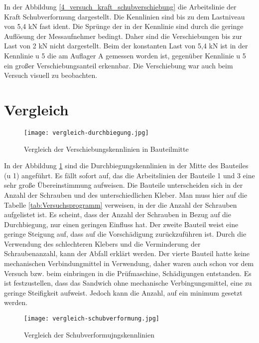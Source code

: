 \documentclass[12 pt,a4 paper ]{scrreprt}
\begin{document}
In der Abbildung \ref{4_versuch_kraft_schubverschiebung} die Arbeitslinie der Kraft Schubverformung dargestellt. Die Kennlinien sind bis zu dem Lastniveau von 5,4 kN fast ident. Die Sprünge der in der Kennlinie sind durch die geringe Auflösung der Messaufnehmer bedingt. Daher sind die Verschiebungen bis zur Last von 2 kN nicht dargestellt. Beim der konstanten Last von 5,4 kN ist in der Kennlinie u 5 die am Auflager A gemessen worden ist, gegenüber Kennlinie u 5 ein großer Verschiebungsanteil erkennbar. Die Verschiebung war auch beim Versuch visuell zu beobachten.  


\section{Vergleich}



\begin{figure}
\begin{center}
\texttt{[image: vergleich-durchbiegung.jpg]}
\caption{Vergleich der Verschiebungskennlinien in Bauteilmitte}
\label{vergleich-durchbiegung}
\end{center}
\end{figure}

In der Abbildung \ref{vergleich-durchbiegung} sind die Durchbiegungskennlinien in der Mitte des Bauteiles (u 1) angeführt.
Es fällt sofort auf, das die Arbeitslinien der Bauteile 1 und 3 eine sehr große Übereinstimmung aufweisen. Die Bauteile unterscheiden sich in der Anzahl der Schrauben und des unterschiedlichen Kleber. Man muss hier auf die Tabelle \ref{tab:Versuchsprogramm} verweisen, in der die Anzahl der Schrauben aufgelistet ist. Es scheint, dass der Anzahl der Schrauben in Bezug auf die Durchbiegung, nur einen geringen Einfluss hat. Der zweite Bauteil weist eine geringe Steigung auf, dass auf die Vorschädigung zurückzuführen ist. Durch die Verwendung des schlechteren Klebers und die Verminderung der Schraubenanzahl, kann der Abfall erklärt werden. Der vierte Bauteil hatte keine mechanischen Verbindungmittel in Verwendung, daher waren auch schon vor dem Versuch bzw. beim einbringen in die Prüfmaschine, Schädigungen entstanden. 
Es ist festzustellen, dass das Sandwich ohne mechanische Verbingungsmittel, eine zu geringe Steifigkeit aufweist. Jedoch kann die Anzahl, auf ein minimum gesetzt werden.


\begin{figure}
\begin{center}
\texttt{[image: vergleich-schubverformung.jpg]}
\caption{Vergleich der Schubverformujngskennlinien}
\label{vergleich-schubverformung}
\end{center}
\end{figure}
\end{document}
